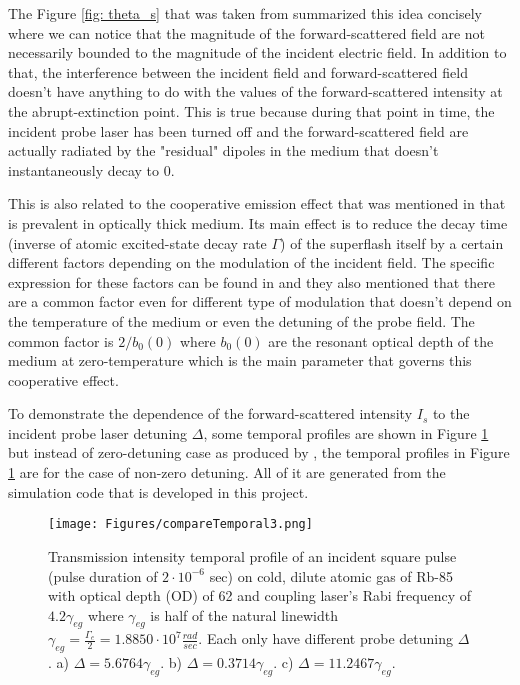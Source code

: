 The Figure \ref{fig: theta_s} that was taken from  summarized this idea concisely where we can notice that the magnitude of the forward-scattered field are not necessarily bounded to the magnitude of the incident electric field. In addition to that, the interference between the incident field and forward-scattered field doesn't have anything to do with the values of the forward-scattered intensity at the abrupt-extinction point. This is true because during that point in time, the incident probe laser has been turned off and the forward-scattered field are actually radiated by the "residual" dipoles in the medium that doesn't instantaneously decay to $0$.

This is also related to the cooperative emission effect that was mentioned in  that is prevalent in optically thick medium. Its main effect is to reduce the decay time (inverse of atomic excited-state decay rate $\Gamma$) of the superflash itself by a certain different factors depending on the modulation of the incident field. The specific expression for these factors can be found in  and they also mentioned that there are a common factor even for different type of modulation that doesn't depend on the temperature of the medium or even the detuning of the probe field. The common factor is $2/b_{0}(0)$ where $b_{0}(0)$ are the resonant optical depth of the medium at zero-temperature which is the main parameter that governs this cooperative effect.

To demonstrate the dependence of the forward-scattered intensity $I_{s}$ to the incident probe laser detuning $\Delta$, some temporal profiles are shown in Figure \ref{fig: comparing temporal profile 2} but instead of zero-detuning case as produced by , the temporal profiles in Figure \ref{fig: comparing temporal profile 2} are for the case of non-zero detuning. All of it are generated from the simulation code that is developed in this project.

\begin{figure}
    \centering
    \texttt{[image: Figures/compareTemporal3.png]}
    \caption[Plots of Transmitted Intensity Temporal Profile for Different Detunings]{Transmission intensity temporal profile of an incident square pulse (pulse duration of $2\cdot10^{-6}$ sec) on cold, dilute atomic gas of Rb-85 with optical depth (OD) of 62 and coupling laser's Rabi frequency of $4.2\gamma_{eg}$ where $\gamma_{eg}$ is half of the natural linewidth $\gamma_{eg} = \frac{\Gamma_{e}}{2} = 1.8850 \cdot 10^{7} \frac{rad}{sec}$. Each only have different probe detuning $\Delta$. a) $\Delta = 5.6764\gamma_{eg}$. b) $\Delta = 0.3714\gamma_{eg}$. c) $\Delta = 11.2467\gamma_{eg}$.}
    \label{fig: comparing temporal profile 2}
\end{figure}

